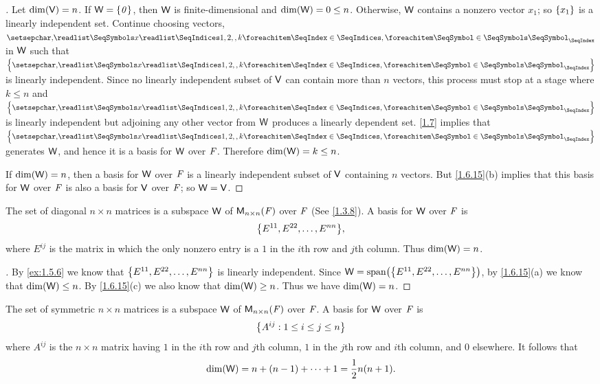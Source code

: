 \begin{proof}[]
	Let \(\dim(\mathsf{V}) = n\).
	If \(\mathsf{W} = \left\lbrace\mathit{0}\right\rbrace\), then \(\mathsf{W}\) is finite-dimensional and \(\dim(\mathsf{W}) = 0 \leq n\).
	Otherwise, \(\mathsf{W}\) contains a nonzero vector \(x_1\);
	so \(\left\lbrace x_1\right\rbrace\) is a linearly independent set.
	Continue choosing vectors, \(\seq{x}{1,2,,k}\) in \(\mathsf{W}\) such that \(\set{\seq{x}{1,2,,k}}\) is linearly independent.
	Since no linearly independent subset of \(\mathsf{V}\) can contain more than \(n\) vectors, this process must stop at a stage where \(k \leq n\) and \(\set{\seq{x}{1,2,,k}}\) is linearly independent but adjoining any other vector from \(\mathsf{W}\) produces a linearly dependent set.
	\cref{1.7} implies that \(\set{\seq{x}{1,2,,k}}\) generates \(\mathsf{W}\), and hence it is a basis for \(\mathsf{W}\) over \(\mathit{F}\).
	Therefore \(\dim(\mathsf{W}) = k \leq n\).

	If \(\dim(\mathsf{W}) = n\), then a basis for \(\mathsf{W}\) over \(\mathit{F}\) is a linearly independent subset of \(\mathsf{V}\) containing \(n\) vectors.
	But \cref{1.6.15}(b) implies that this basis for \(\mathsf{W}\) over \(\mathit{F}\) is also a basis for \(\mathsf{V}\) over \(\mathit{F}\);
	so \(\mathsf{W} = \mathsf{V}\).
\end{proof}

\begin{eg}\label{1.6.17}
	The set of diagonal \(n \times n\) matrices is a subspace \(\mathsf{W}\) of \(\mathsf{M}_{{n} \times n}({\mathit{F}})\) over \(\mathit{F}\)
	(See \cref{1.3.8}).
	A basis for \(\mathsf{W}\) over \(\mathit{F}\) is
	\[
		\set{E^{1 1}, E^{2 2}, \dots, E^{n n}},
	\]
	where \(E^{i j}\) is the matrix in which the only nonzero entry is a \(1\) in the \(i\)th row and \(j\)th column.
	Thus \(\dim(\mathsf{W}) = n\).
\end{eg}

\begin{proof}[]
	By \cref{ex:1.5.6} we know that \(\left\lbrace E^{1 1}, E^{2 2}, \dots, E^{n n}\right\rbrace\) is linearly independent.
	Since \(\W = \spn{\set{E^{1 1}, E^{2 2}, \dots, E^{n n}}}\), by \cref{1.6.15}(a) we know that \(\dim(\mathsf{W}) \leq n\).
	By \cref{1.6.15}(c) we also know that \(\dim(\mathsf{W}) \geq n\).
	Thus we have \(\dim(\mathsf{W}) = n\).
\end{proof}

\begin{eg}\label{1.6.18}
	The set of symmetric \(n \times n\) matrices is a subspace \(\mathsf{W}\) of \(\mathsf{M}_{{n} \times n}({\mathit{F}})\) over \(\mathit{F}\).
	A basis for \(\mathsf{W}\) over \(\mathit{F}\) is
	\[
		\left\lbrace A^{i j} : 1 \leq i \leq j \leq n\right\rbrace
	\]
	where \(A^{i j}\) is the \(n \times n\) matrix having \(1\) in the \(i\)th row and \(j\)th column, \(1\) in the \(j\)th row and \(i\)th column, and \(0\) elsewhere.
	It follows that
	\[
		\dim(\mathsf{W}) = n + (n - 1) + \cdots + 1 = \frac{1}{2} n(n + 1).
	\]
\end{eg}

